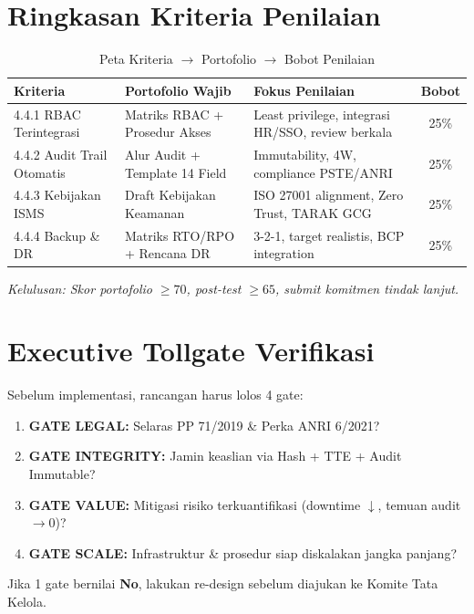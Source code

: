 \documentclass[12pt,a4paper]{report}
\begin{document}
\section{Ringkasan Kriteria Penilaian}
\begin{table}[htbp]
\centering
\small
\caption{Peta Kriteria $\rightarrow$ Portofolio $\rightarrow$ Bobot Penilaian}
\begin{tabularx}{\textwidth}{@{} l X X c @{}}
\toprule
\textbf{Kriteria} & \textbf{Portofolio Wajib} & \textbf{Fokus Penilaian} & \textbf{Bobot} \\
\midrule
4.4.1 RBAC Terintegrasi & Matriks RBAC + Prosedur Akses & Least privilege, integrasi HR/SSO, review berkala & 25\% \\
4.4.2 Audit Trail Otomatis & Alur Audit + Template 14 Field & Immutability, 4W, compliance PSTE/ANRI & 25\% \\
4.4.3 Kebijakan ISMS & Draft Kebijakan Keamanan & ISO 27001 alignment, Zero Trust, TARAK GCG & 25\% \\
4.4.4 Backup \& DR & Matriks RTO/RPO + Rencana DR & 3-2-1, target realistis, BCP integration & 25\% \\
\bottomrule
\end{tabularx}
\end{table}
\textit{Kelulusan: Skor portofolio $\geq 70$, post-test $\geq 65$, submit komitmen tindak lanjut.}

\section{Executive Tollgate Verifikasi}
Sebelum implementasi, rancangan harus lolos 4 gate:
\begin{enumerate}[leftmargin=*]
    \item \textbf{GATE LEGAL:} Selaras PP 71/2019 \& Perka ANRI 6/2021?
    \item \textbf{GATE INTEGRITY:} Jamin keaslian via Hash + TTE + Audit Immutable?
    \item \textbf{GATE VALUE:} Mitigasi risiko terkuantifikasi (downtime $\downarrow$, temuan audit $\rightarrow 0$)?
    \item \textbf{GATE SCALE:} Infrastruktur \& prosedur siap diskalakan jangka panjang?
\end{enumerate}
Jika 1 gate bernilai \textbf{No}, lakukan re-design sebelum diajukan ke Komite Tata Kelola.
\end{document}
